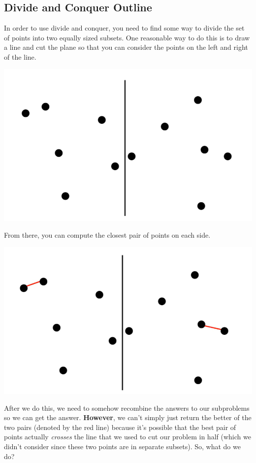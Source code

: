 \documentclass[letterpaper]{article}
\begin{document}
\subsection{Divide and Conquer Outline}
In order to use divide and conquer, you need to find some way to divide the set of points into two equally sized subsets. One reasonable way to do this is to draw a line and cut the plane so that you can consider the points on the left and right of the line. 
\begin{center}
    \includegraphics[scale=0.2]{../assets/closest_pts_1.png}
\end{center}
From there, you can compute the closest pair of points on each side. 
\begin{center}
    \includegraphics[scale=0.2]{../assets/closest_pts_2.png}
\end{center}
After we do this, we need to somehow recombine the answers to our subproblems so we can get the answer. \textbf{However}, we can't simply just return the better of the two pairs (denoted by the red line) because it's possible that the best pair of points actually \emph{crosses} the line that we used to cut our problem in half (which we didn't consider since these two points are in separate subsets). So, what do we do? 
\end{document}
